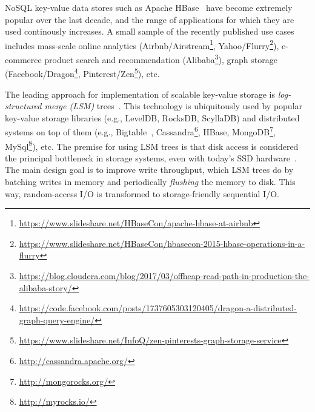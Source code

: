 
NoSQL key-value data stores such as Apache HBase~\cite{hbase} have become extremely popular over the last decade, 
and the range of applications for which they are used continously increases. A small sample of the recently 
published use cases includes mass-scale online analytics (Airbnb/Airstream\footnote{\small{\url{https://www.slideshare.net/HBaseCon/apache-hbase-at-airbnb}}}, 
Yahoo/Flurry\footnote{\small{\url{https://www.slideshare.net/HBaseCon/hbasecon-2015-hbase-operations-in-a-flurry}}}), e-commerce product search 
and recommendation (Alibaba\footnote{\small{\url{https://blog.cloudera.com/blog/2017/03/offheap-read-path-in-production-the-alibaba-story/}}}), 
graph storage (Facebook/Dragon\footnote{\small{\url{https://code.facebook.com/posts/1737605303120405/dragon-a-distributed-graph-query-engine/}}}, 
Pinterest/Zen\footnote{\small{\url{https://www.slideshare.net/InfoQ/zen-pinterests-graph-storage-service}}}), etc. 


The leading approach for implementation of scalable key-value storage is \emph{log-structured merge (LSM)} trees~\cite{O'Neil:1996}.
This technology is ubiquitously used by popular key-value storage libraries (e.g., LevelDB, RocksDB, ScyllaDB) and distributed systems on top 
of them (e.g., Bigtable~\cite{Chang2008}, Cassandra\footnote{\small{\url{http://cassandra.apache.org/}}}, HBase, 
MongoDB\footnote{\small{\url{http://mongorocks.org/}}}, MySql\footnote{\small{\url{http://myrocks.io/}}}), etc. 
The premise for using LSM trees is that disk access is considered the principal bottleneck in storage systems, even with today's SSD hardware~\cite{rocksdb,Tanenbaum:2014:MOS:2655363,Wu:2012:AWB:2093139.2093140}. 
The main design goal is to improve write throughput, which LSM trees do by batching writes in memory 
and periodically \emph{flushing} the memory  to disk. This way, random-access I/O is transformed to storage-friendly sequential I/O. 

